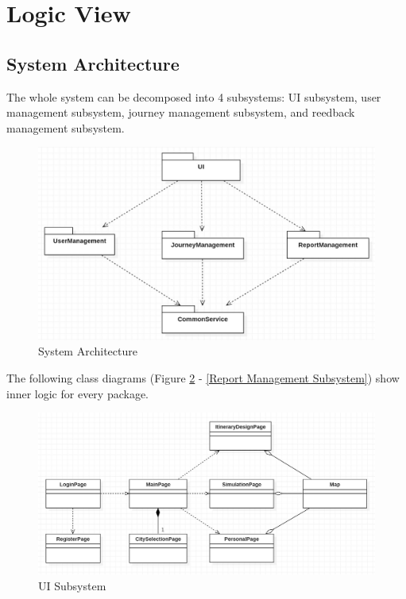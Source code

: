\documentclass[10pt]{article}
\begin{document}
\section{Logic View}
\subsection{System Architecture}
The whole system can be decomposed into 4 subsystems: UI subsystem, user management subsystem, journey management subsystem, and reedback management subsystem.

\begin{figure}[H]
    \centering
    \includegraphics[width=14cm]{architecture.jpg}
    \caption{System Architecture}
    \label{System Architecture}
\end{figure}

The following class diagrams (Figure \ref{UI Subsystem} - \ref{Report Management Subsystem}) show inner logic for every package.

\begin{figure}[H]
    \centering
    
    \includegraphics[width=14cm]{ui.jpg}
    \caption{UI Subsystem}
    \label{UI Subsystem}
\end{figure}
\end{document}
